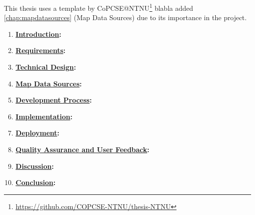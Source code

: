 This thesis uses a template by CoPCSE@NTNU\footnote{\url{https://github.com/COPCSE-NTNU/thesis-NTNU}} blabla added \autoref{chap:mapdatasources} (Map Data Sources) due to its importance in the project.

\begin{enumerate}
    \item \textbf{\hyperref[chap:introduction]{Introduction}:}
    \item \textbf{\hyperref[chap:requirements]{Requirements}:}
    \item \textbf{\hyperref[chap:technicaldesign]{Technical Design}:}
    \item \textbf{\hyperref[chap:mapdatasources]{Map Data Sources}:}
    \item \textbf{\hyperref[chap:developmentprocess]{Development Process}:}
    \item \textbf{\hyperref[chap:implementation]{Implementation}:}
    \item \textbf{\hyperref[chap:deployment]{Deployment}:}
    \item \textbf{\hyperref[chap:qualityassuranceanduserfeedback]{Quality Assurance and User Feedback}:}
    \item \textbf{\hyperref[chap:discussion]{Discussion}:}
    \item \textbf{\hyperref[chap:conclusion]{Conclusion}:}
\end{enumerate}

